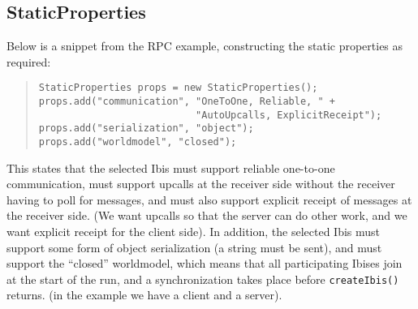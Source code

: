 \documentclass[10pt]{article}
\newcommand{\mysubsection}[1]{\subsection{#1}\label{#1}}
\begin{document}
\mysubsection{StaticProperties}

Below is a snippet from the RPC example, constructing the static
properties as required:
\begin{quote}
\begin{verbatim}
StaticProperties props = new StaticProperties();
props.add("communication", "OneToOne, Reliable, " + 
                           "AutoUpcalls, ExplicitReceipt");
props.add("serialization", "object");
props.add("worldmodel", "closed");
\end{verbatim}
\end{quote}
This states that the selected Ibis must support reliable one-to-one
communication, must support upcalls at the receiver side without the
receiver having to poll for messages, and must also support explicit
receipt of messages at the receiver side.
(We want upcalls so that the server can do other work, and we want
explicit receipt for the client side).
In addition, the selected Ibis must support some form of object
serialization (a string must be sent),
and must support the ``closed'' worldmodel, which means
that all participating Ibises join at the start of the run, and a
synchronization takes place before \texttt{createIbis()} returns.
(in the example we have a client and a server).
\end{document}
